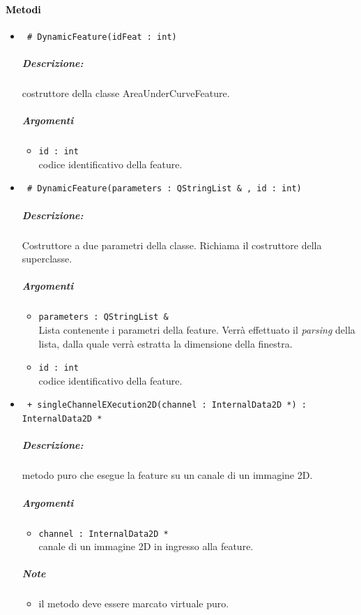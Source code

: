\paragraph{\textcolor{black}{Metodi\\}}
	\begin{itemize}
	\item \color{blue}\verb! # DynamicFeature(idFeat : int)!
		\color{black}
		\subparagraph{Descrizione:} costruttore della classe AreaUnderCurveFeature.
		\subparagraph{Argomenti}
			\begin{itemize}
				\item \color{RoyalPurple} \verb!id : int! \\ 
				\color{black} codice identificativo della feature\g{}.	
			\end{itemize}
			
	\item \color{blue}\verb! # DynamicFeature(parameters : QStringList & , id : int)!
		\color{black}
		\subparagraph{Descrizione:} Costruttore a due parametri della classe. Richiama il costruttore della 						superclasse.
		\subparagraph{Argomenti}
			\begin{itemize}	
				\item \color{RoyalPurple} \verb!parameters : QStringList &! \\ 
				\color{black} Lista contenente i parametri della feature\g{}. Verrà effettuato il \textit{parsing} 						della lista, dalla quale verrà estratta la dimensione della finestra.
				\item \color{RoyalPurple} \verb!id : int! \\ 
				\color{black} codice identificativo della feature\g{}.	
			\end{itemize}

	\item \color{blue}\verb! + singleChannelEXecution2D(channel : InternalData2D *) : InternalData2D *!
		\color{black}
		\subparagraph{Descrizione:} metodo puro che esegue la feature su un canale di un immagine 2D.
		\subparagraph{Argomenti}
			\begin{itemize}
				\item \color{RoyalPurple} \verb!channel : InternalData2D * ! \\ 
				\color{black} canale di un immagine 2D in ingresso alla feature.		
			\end{itemize}
		\subparagraph{Note}
			\begin{itemize}
				\item il metodo deve essere marcato virtuale puro.
			\end{itemize}
			

\end{itemize}
